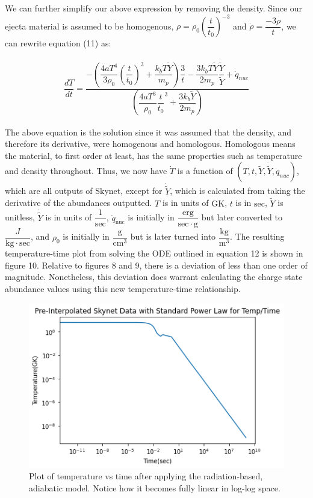\documentclass[11pt,a4paper]{article}
\begin{document}
We can further simplify our above expression by removing the density. Since our ejecta material is assumed to be homogenous,  $\rho = \rho_0 \left(\dfrac{t}{t_0}\right)^{-3}$ and $\dot{\rho} = \dfrac{-3 \rho}{t}$, we can rewrite equation (11) as:

\begin{align}
	\dfrac{dT}{dt} =  \dfrac{ -\left( \dfrac{4aT^4}{3 \rho_0} \left (\dfrac{t}{t_0} \right)^3 + \dfrac{k_b T \tilde{Y}}{m_p} \right) \dfrac{3}{t} - \dfrac{3 k_b T \tilde{Y}}{2 m_p} \dfrac{\dot{\tilde{Y}}}{\tilde{Y}} + \dot{q}_{nuc} } {  \left( \dfrac{4 a T^3}{\rho_0} \dfrac{t}{t_0}^3 + \dfrac{3 k_b \tilde{Y}}{2 m_p}\right) }
\end{align}

The above equation is the solution since it was assumed that the density, and therefore its derivative, were homogenous and homologous. Homologous means the material, to first order at least, has the same properties such as temperature and density throughout.  Thus, we now have $\dot{T}$ is a function of $(T,t,\tilde{Y}, \dot{\tilde{Y}},\dot{q}_{nuc})$, which are all outputs of Skynet, except for $\dot{\tilde{Y}}$, which is calculated from taking the derivative of the abundances outputted. $T$ is in units of $\mathrm{GK}$, $t$ is in $\mathrm{sec}$, $\tilde{Y}$ is unitless, $\dot{\tilde{Y}}$ is in units of $\dfrac{1}{\mathrm{sec}}$, $\dot{q}_{\mathrm{nuc}}$ is initially in $\dfrac{\mathrm{erg}}{\mathrm{sec \cdot g}}$ but later converted to $\dfrac{J}{\mathrm{kg \cdot sec}}$, and $\rho_0$ is initially in $\dfrac{\mathrm{g}}{{\mathrm{cm}}^3}$ but is later turned into $\dfrac{\mathrm{kg}}{\mathrm{m}^3}$. The resulting temperature-time plot from solving the ODE outlined in equation 12 is shown in figure 10. Relative to figures 8 and 9, there is a deviation of less than one order of magnitude. Nonetheless, this deviation does warrant calculating the charge state abundance values using this new temperature-time relationship. \\


\begin{figure}[h!]
  \includegraphics[scale = .7]{linear_temp.png}
  \centering
  \caption{Plot of temperature vs time after applying the radiation-based, adiabatic model. Notice how it becomes fully linear in log-log space.}
\end{figure} 
\end{document}
